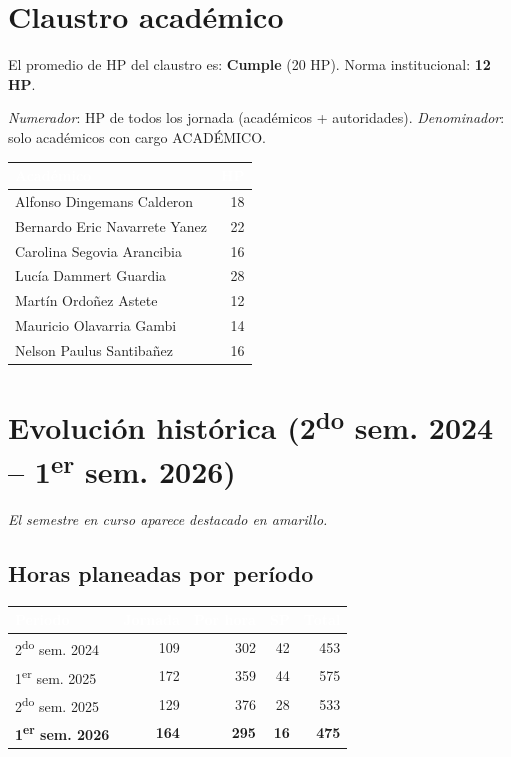 \documentclass[11pt, a4paper]{article}
\begin{document}
\section{Claustro académico}

El promedio de HP del claustro es: \textcolor{green!60!black}{\textbf{Cumple}} (20 HP). Norma institucional: \textbf{12 HP}.

\textit{Numerador}: HP de todos los jornada (académicos + autoridades). \textit{Denominador}: solo académicos con cargo ACADÉMICO.

\begin{tabular}{lr}
\toprule
\rowcolor{usachDark} \textbf{\textcolor{white}{Académico}} & \textbf{\textcolor{white}{HP}} \\
\midrule
Alfonso Dingemans Calderon & 18 \\
\rowcolor{rowEven}Bernardo Eric Navarrete Yanez & 22 \\
Carolina Segovia Arancibia & 16 \\
\rowcolor{rowEven}Lucía Dammert Guardia & 28 \\
Martín Ordoñez Astete & 12 \\
\rowcolor{rowEven}Mauricio Olavarria Gambi & 14 \\
Nelson Paulus Santibañez & 16 \\
\bottomrule
\end{tabular}

\section{Evolución histórica (2\textsuperscript{do} sem. 2024 -- 1\textsuperscript{er} sem. 2026)}

\textit{El semestre en curso aparece destacado en amarillo.}

\subsection{Horas planeadas por período}

\begin{tabular}{lrrrr}
\toprule
\rowcolor{usachDark} \textbf{\textcolor{white}{Periodo}} & \textbf{\textcolor{white}{Jornada}} & \textbf{\textcolor{white}{Por hora}} & \textbf{\textcolor{white}{SP}} & \textbf{\textcolor{white}{Total}} \\
\midrule
2\textsuperscript{do} sem. 2024 & 109 & 302 & 42 & 453 \\
\rowcolor{rowEven}1\textsuperscript{er} sem. 2025 & 172 & 359 & 44 & 575 \\
2\textsuperscript{do} sem. 2025 & 129 & 376 & 28 & 533 \\
\rowcolor{rowHighlight}\textbf{1\textsuperscript{er} sem. 2026} & \textbf{164} & \textbf{295} & \textbf{16} & \textbf{475} \\
\bottomrule
\end{tabular}
\end{document}
